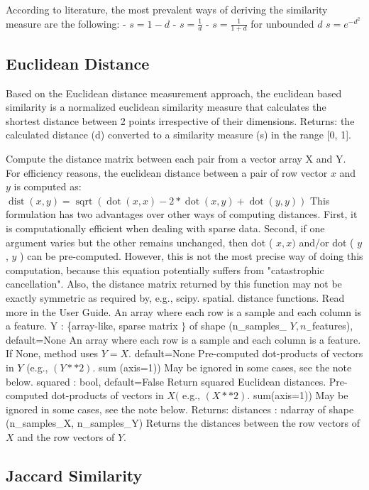 According to literature, the most prevalent ways of deriving the similarity measure are the following: 
- $s=1-d$
- $s=\frac{1}{d}$
- $s=\frac{1}{1+d}$ for unbounded $d$
$s=e^{-d^{2}}$

\subsection{Euclidean Distance}
Based on the Euclidean distance measurement approach, the euclidean based similarity  is a normalized euclidean similarity measure that calculates the shortest distance between 2 points irrespective of their dimensions.  Returns: the calculated distance (d) converted to a similarity measure (s) in the range [0, 1].

Compute the distance matrix between each pair from a vector array $\mathrm{X}$ and $\mathrm{Y}$.
For efficiency reasons, the euclidean distance between a pair of row vector $x$ and $y$ is computed as:
$\operatorname{dist}(x, y)=\operatorname{sqrt}(\operatorname{dot}(x, x)-2 * \operatorname{dot}(x, y)+\operatorname{dot}(y, y))$
This formulation has two advantages over other ways of computing distances. First, it is computationally efficient when dealing with sparse data. Second, if one argument varies but the other remains unchanged, then dot ( $x, x)$ and/or dot ( $y$, $y$ ) can be pre-computed.
However, this is not the most precise way of doing this computation, because this equation potentially suffers from "catastrophic cancellation". Also, the distance matrix returned by this function may not be exactly symmetric as required by, e.g., scipy. spatial. distance functions.
Read more in the User Guide. An array where each row is a sample and each column is a feature.
Y : \{array-like, sparse matrix $\}$ of shape (n_samples_ $Y, n_{-}$features), default=None An array where each row is a sample and each column is a feature. If None, method uses $Y=X$. default=None
Pre-computed dot-products of vectors in $Y$ (e.g., $(Y * * 2) .$ sum (axis=1)) May be ignored in some cases, see the note below.
squared : bool, default=False
Return squared Euclidean distances.
Pre-computed dot-products of vectors in $X($ e.g., $(X * * 2)$. sum(axis=1)) May be ignored in some cases, see the note below.
Returns: distances : ndarray of shape (n_samples_X, n_samples_Y) Returns the distances between the row vectors of $X$ and the row vectors of $Y$.

\subsection{Jaccard Similarity}

